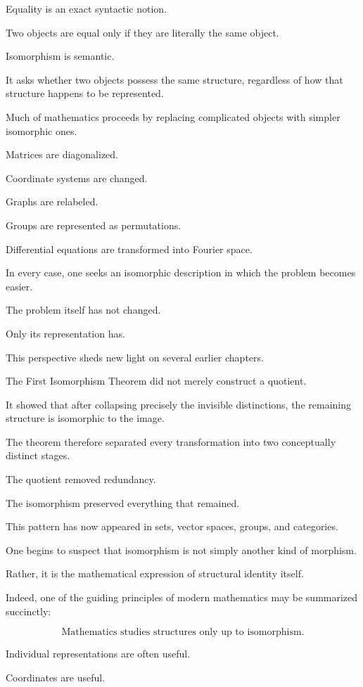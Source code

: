 \documentclass[11pt]{book}
\numberwithin{equation}{chapter}
\theoremstyle{definition}
\theoremstyle{plain}
\theoremstyle{remark}
\begin{document}
Equality is an exact syntactic notion.

Two objects are equal only if they are literally the same object.

Isomorphism is semantic.

It asks whether two objects possess the same structure, regardless of how that structure happens to be represented.

Much of mathematics proceeds by replacing complicated objects with simpler isomorphic ones.

Matrices are diagonalized.

Coordinate systems are changed.

Graphs are relabeled.

Groups are represented as permutations.

Differential equations are transformed into Fourier space.

In every case, one seeks an isomorphic description in which the problem becomes easier.

The problem itself has not changed.

Only its representation has.

This perspective sheds new light on several earlier chapters.

The First Isomorphism Theorem did not merely construct a quotient.

It showed that after collapsing precisely the invisible distinctions, the remaining structure is isomorphic to the image.

The theorem therefore separated every transformation into two conceptually distinct stages.

The quotient removed redundancy.

The isomorphism preserved everything that remained.

This pattern has now appeared in sets, vector spaces, groups, and categories.

One begins to suspect that isomorphism is not simply another kind of morphism.

Rather, it is the mathematical expression of structural identity itself.

Indeed, one of the guiding principles of modern mathematics may be summarized succinctly:

\[
\boxed{
\text{Mathematics studies structures only up to isomorphism.}
}
\]

Individual representations are often useful.

Coordinates are useful.
\end{document}
